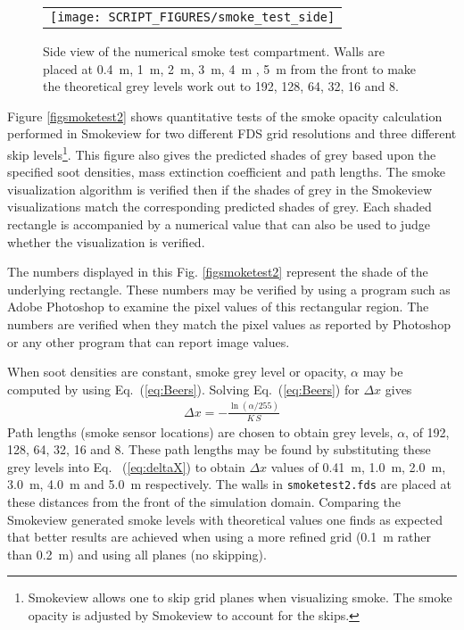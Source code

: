 \documentclass[11pt,twoside]{book}
\begin{document}
\begin{figure}[\figoptions]
\begin{center}
 \centering
\begin{tabular}{c}
 \texttt{[image: SCRIPT\_FIGURES/smoke\_test\_side]}
 \end{tabular}
\end{center}
 \caption[Side view of numerical smoke test compartment.]{Side view of the numerical
 smoke test compartment.  Walls are placed at \SI{0.4}{m}, \SI{1}{m}, \SI{2}{m},
 \SI{3}{m}, \SI{4}{m} , \SI{5}{m} from the front to make the theoretical grey
 levels work out to 192, 128, 64, 32, 16 and 8.}
\label{figsmoketestgeom}%
\end{figure}

Figure \ref{figsmoketest2} shows quantitative tests of the smoke opacity
calculation performed in Smokeview for two different FDS grid resolutions
and three different skip levels\footnote{Smokeview allows one to skip grid planes when visualizing smoke.  The smoke opacity is adjusted by Smokeview to account for the skips.}. This figure also gives the predicted shades of grey based upon the specified soot densities, mass extinction coefficient and path lengths.  The smoke visualization algorithm is verified then if the shades of grey in the Smokeview visualizations match the corresponding predicted shades of grey.  Each shaded rectangle is accompanied by a numerical value that can also be used to judge whether the visualization is verified.

The numbers displayed in this Fig. \ref{figsmoketest2} represent the shade
of the underlying rectangle.  These numbers may be verified by using a
program such as Adobe Photoshop to examine the pixel values of this
rectangular region.  The numbers are verified when they match the pixel
values as reported by Photoshop or any other program that can report
image values.

When soot densities are constant, smoke grey level or opacity, $\alpha$
may be computed by using Eq.~(\ref{eq:Beers}).  Solving Eq.~(\ref{eq:Beers})
for $\Delta x$ gives
\begin{eqnarray}
\label{eq:deltaX}
\Delta x = -\frac{\ln(\alpha/255)}{K \, S}
\end{eqnarray}
Path lengths (smoke sensor locations) are chosen to obtain grey levels, $\alpha$,
of 192, 128, 64, 32, 16 and 8.  These path lengths may be found by substituting
these grey levels into Eq.~ (\ref{eq:deltaX}) to obtain $\Delta x$ values of
0.41~m, 1.0~m, 2.0~m, 3.0~m, 4.0~m and 5.0~m respectively.  The walls in
{\tt smoketest2.fds} are placed at these distances from the front of the
simulation domain. Comparing the Smokeview generated smoke levels with
theoretical values one finds as expected that better results are achieved
when using a more refined grid (0.1~m rather than 0.2~m) and using all planes
(no skipping).
\end{document}
